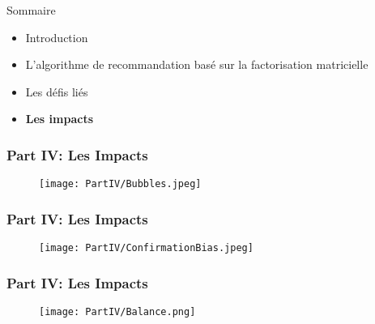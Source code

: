 \begin{frame}{Sommaire}
    \begin{itemize}
        \item Introduction
        \item L'algorithme de recommandation basé sur la factorisation matricielle
        \item Les défis liés
        \item \textbf{Les impacts}
    \end{itemize}
\end{frame}


\begin{frame}
    \frametitle{Part IV: Les Impacts}

    \begin{figure}
        \centering
        \texttt{[image: PartIV/Bubbles.jpeg]}
    \end{figure}

\end{frame}

\begin{frame}
    \frametitle{Part IV: Les Impacts}

    \begin{figure}
        \centering
        \texttt{[image: PartIV/ConfirmationBias.jpeg]}
    \end{figure}

\end{frame}

\begin{frame}
    \frametitle{Part IV: Les Impacts}

    \begin{figure}
        \centering
        \texttt{[image: PartIV/Balance.png]}
    \end{figure}

\end{frame}